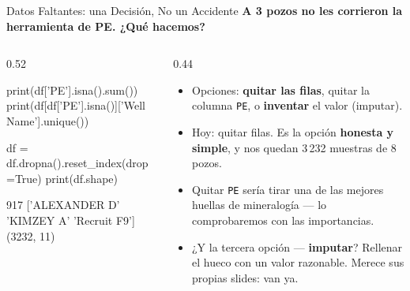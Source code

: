 \documentclass[aspectratio=169, 11pt]{beamer}
\begin{document}
\begin{frame}[fragile,shrink=22]{Datos Faltantes: una Decisión, No un Accidente}
  \vspace{-4pt}
  {\small\color{arcaDark}\bfseries
    A 3 pozos no les corrieron la herramienta de PE. ¿Qué hacemos?}

  \vspace{4pt}
  \begin{columns}[T]
    \begin{column}{0.52\textwidth}
      \begin{pyblock}
print(df['PE'].isna().sum())
print(df[df['PE'].isna()]['Well Name'].unique())

df = df.dropna().reset_index(drop=True)
print(df.shape)
      \end{pyblock}
      \vspace{2pt}
      \begin{outputblock}
917
['ALEXANDER D' 'KIMZEY A' 'Recruit F9']
(3232, 11)
      \end{outputblock}
    \end{column}
    \begin{column}{0.44\textwidth}
      {\scriptsize\color{textMuted}
      \begin{itemize}\setlength{\itemsep}{4pt}
        \item[{\color{arcaRed}\scriptsize\faQuestion}]
          Opciones: \textbf{quitar las filas}, quitar la columna
          \texttt{PE}, o \textbf{inventar} el valor (imputar).
        \item[{\color{codeGreen}\scriptsize\faCheck}]
          Hoy: quitar filas. Es la opción \textbf{honesta y simple},
          y nos quedan 3\,232 muestras de 8 pozos.
        \item[{\color{arcaRed}\scriptsize\faExclamationTriangle}]
          Quitar \texttt{PE} sería tirar una de las mejores huellas
          de mineralogía --- lo comprobaremos con las importancias.
        \item[{\color{arcaRed}\scriptsize\faArrowRight}]
          ¿Y la tercera opción --- \textbf{imputar}? Rellenar el hueco
          con un valor razonable. Merece sus propias slides: van ya.
      \end{itemize}
      }
    \end{column}
  \end{columns}
\end{frame}
\end{document}
